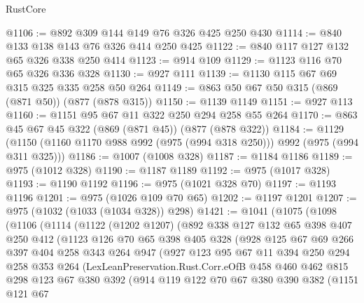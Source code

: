 \begin{lexlean}{RustCore}
\begin{coremodule}
@1106 := @892 @309 @144 @149 @76 @326 @425 @250 @430
@1114 := @840 @133 @138 @143 @76 @326 @414 @250 @425
@1122 := @840 @117 @127 @132 @65 @326 @338 @250 @414
@1123 := @914 @109
@1129 := @1123 @116 @70 @65 @326 @336 @328
@1130 := @927 @111
@1139 := @1130 @115 @67 @69 @315 @325 @335 @258 @50 @264
@1149 := @863 @50 @67 @50 @315 (@869 (@871 @50)) (@877 (@878 @315))
@1150 := @1139 @1149
@1151 := @927 @113
@1160 := @1151 @95 @67 @11 @322 @250 @294 @258 @55 @264
@1170 := @863 @45 @67 @45 @322 (@869 (@871 @45)) (@877 (@878 @322))
@1184 := @1129 (@1150 (@1160 @1170 @988 @992 (@975 (@994 @318 @250))) @992 (@975 (@994 @311 @325)))
@1186 := @1007 (@1008 @328)
@1187 := @1184 @1186
@1189 := @975 (@1012 @328)
@1190 := @1187 @1189
@1192 := @975 (@1017 @328)
@1193 := @1190 @1192
@1196 := @975 (@1021 @328 @70)
@1197 := @1193 @1196
@1201 := @975 (@1026 @109 @70 @65)
@1202 := @1197 @1201
@1207 := @975 (@1032 (@1033 (@1034 @328)) @298)
@1421 := @1041
    (@1075
      (@1098
        (@1106
          (@1114
            (@1122
              (@1202 @1207)
              (@892
                @338
                @127
                @132
                @65
                @398
                @407
                @250
                @412
                (@1123
                  @126
                  @70
                  @65
                  @398
                  @405
                  @328
                  (@928
                    @125
                    @67
                    @69
                    @266
                    @397
                    @404
                    @258
                    @343
                    @264
                    @947
                    (@927
                      @123
                      @95
                      @67
                      @11
                      @394
                      @250
                      @294
                      @258
                      @353
                      @264
                      (LexLeanPreservation.Rust.Corr.eOfB
                        @458
                        @460
                        @462
                        @815
                        @298
                        @123
                        @67
                        @380
                        @392
                        (@914
                          @119
                          @122
                          @70
                          @67
                          @380
                          @390
                          @382
                          (@1151
                            @121
                            @67

\end{coremodule}
\end{lexlean}
